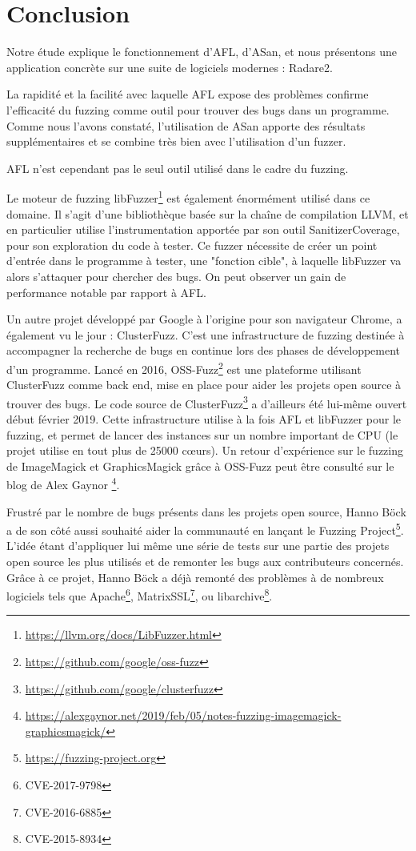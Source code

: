 \chapter*{Conclusion}

Notre étude explique le fonctionnement d'AFL, d'ASan, et nous présentons une
application concrète sur une suite de logiciels modernes : Radare2.

La rapidité et la facilité avec laquelle AFL expose des problèmes confirme
l'efficacité du fuzzing comme outil pour trouver des bugs dans un programme.
Comme nous l'avons constaté, l'utilisation de ASan apporte des résultats
supplémentaires et se combine très bien avec l'utilisation d'un fuzzer.

AFL n'est cependant pas le seul outil utilisé dans le cadre du fuzzing.

Le moteur de fuzzing libFuzzer\footnote{\url{https://llvm.org/docs/LibFuzzer.html}}
est également énormément utilisé dans ce domaine.
Il s'agit d'une bibliothèque basée sur la chaîne de compilation LLVM, et en
particulier utilise l'instrumentation apportée par son outil SanitizerCoverage,
pour son exploration du code à tester.
Ce fuzzer nécessite de créer un point d'entrée dans le programme à tester, une
"fonction cible", à laquelle libFuzzer va alors s'attaquer pour chercher des bugs.
On peut observer un gain de performance notable par rapport à AFL.

Un autre projet développé par Google à l'origine pour son navigateur Chrome,
a également vu le jour : ClusterFuzz.
C'est une infrastructure de fuzzing destinée à accompagner la recherche de
bugs en continue lors des phases de développement d'un programme.
Lancé en 2016, OSS-Fuzz\footnote{\url{https://github.com/google/oss-fuzz}}
est une plateforme utilisant ClusterFuzz comme back end, mise en place pour
aider les projets open source à trouver des bugs. Le code source de
ClusterFuzz\footnote{\url{https://github.com/google/clusterfuzz}}
a d'ailleurs été lui-même ouvert début février 2019.
Cette infrastructure utilise à la fois AFL et libFuzzer pour le fuzzing,
et permet de lancer des instances sur un nombre important de CPU (le projet
utilise en tout plus de 25000 cœurs).
Un retour d'expérience sur le fuzzing de ImageMagick et GraphicsMagick grâce à OSS-Fuzz
peut être consulté sur le blog de Alex Gaynor
\footnote{\url{https://alexgaynor.net/2019/feb/05/notes-fuzzing-imagemagick-graphicsmagick/}}.

Frustré par le nombre de bugs présents dans les projets open source, Hanno
Böck a de son côté aussi souhaité aider la communauté en lançant
le Fuzzing Project\footnote{\url{https://fuzzing-project.org}}. L'idée étant
d'appliquer lui même une série de tests sur une partie des projets open
source les plus utilisés et de remonter les bugs aux contributeurs concernés.
Grâce à ce projet, Hanno Böck a déjà remonté des problèmes à de nombreux
logiciels tels que Apache\footnote{CVE-2017-9798}, MatrixSSL\footnote{CVE-2016-6885},
ou libarchive\footnote{CVE-2015-8934}.
